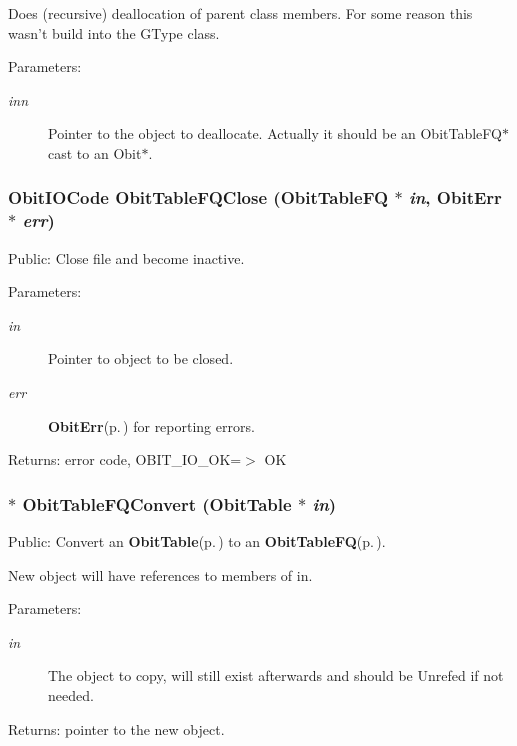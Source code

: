 Does (recursive) deallocation of parent class members. For some reason this wasn't build into the GType class. \begin{Desc}
\item[Parameters:]
\begin{description}
\item[{\em inn}]Pointer to the object to deallocate. Actually it should be an Obit\-Table\-FQ$\ast$ cast to an Obit$\ast$. \end{description}
\end{Desc}
\subsubsection{\setlength{\rightskip}{0pt plus 5cm}Obit\-IOCode Obit\-Table\-FQClose ({\bf Obit\-Table\-FQ} $\ast$ {\em in}, {\bf Obit\-Err} $\ast$ {\em err})}\label{ObitTableFQ_8c_a25}


Public: Close file and become inactive. 

\begin{Desc}
\item[Parameters:]
\begin{description}
\item[{\em in}]Pointer to object to be closed. \item[{\em err}]{\bf Obit\-Err}{\rm (p.\,\pageref{structObitErr})} for reporting errors. \end{description}
\end{Desc}
\begin{Desc}
\item[Returns:]error code, OBIT\_\-IO\_\-OK=$>$ OK \end{Desc}
\subsubsection{$\ast$ Obit\-Table\-FQConvert ({\bf Obit\-Table} $\ast$ {\em in})}\label{ObitTableFQ_8c_a19}


Public: Convert an {\bf Obit\-Table}{\rm (p.\,\pageref{structObitTable})} to an {\bf Obit\-Table\-FQ}{\rm (p.\,\pageref{structObitTableFQ})}. 

New object will have references to members of in. \begin{Desc}
\item[Parameters:]
\begin{description}
\item[{\em in}]The object to copy, will still exist afterwards and should be Unrefed if not needed. \end{description}
\end{Desc}
\begin{Desc}
\item[Returns:]pointer to the new object. \end{Desc}
